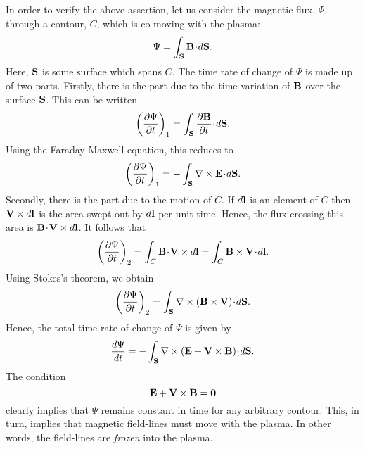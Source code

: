 In order to verify the above assertion, let us consider the
magnetic flux, ${\Psi}$, through a contour, $C$, which is co-moving
with the plasma:
\begin{equation}
{\Psi} = \int_{\bf S} {\bf B}\!\cdot\!d{\bf S}.
\end{equation}
Here, ${\bf S}$ is some surface which spans $C$. The time rate of
change of ${\Psi}$ is made up of two parts. Firstly, there
is the part due to the time variation of ${\bf B}$  over the
surface ${\bf S}$. This can be written
\begin{equation}
\left(\frac{\partial{ \Psi}}{\partial t}\right)_1 = 
\int_{\bf S} \frac{\partial{\bf B}}{\partial t}\!\cdot\!d{\bf S}.
\end{equation}
Using the Faraday-Maxwell equation, this reduces to
\begin{equation}
\left(\frac{\partial{ \Psi}}{\partial t}\right)_1 = -
\int_{\bf S} \nabla \times{\bf E} \!\cdot\!d{\bf S}.
\end{equation}
Secondly, there is the part due to the motion of $C$. If $d{\bf l}$
is an element of $C$ then ${\bf V}\times d{\bf l}$ is the area swept out
by $d{\bf l}$ per unit time. Hence, the flux crossing this area is
${\bf B} \!\cdot\!{\bf V}\times d{\bf l}$.
It follows that 
\begin{equation}
\left(\frac{\partial{ \Psi}}{\partial t}\right)_2 = \int_C {\bf B} \!\cdot\!{\bf V}\times d{\bf l} = \int_C {\bf B}\times{\bf V} \!\cdot\!d{\bf l}.
\end{equation}
Using Stokes's theorem, we obtain
\begin{equation}
\left(\frac{\partial{ \Psi}}{\partial t}\right)_2= \int_{\bf S} \nabla\times
({\bf B}\times
{\bf V})\!\cdot\!d{\bf S}.
\end{equation}
Hence, the total time rate of change of ${\Psi}$ is given by
\begin{equation}
\frac{d{\Psi}}{dt} = - \int_{\bf S}\nabla\times\left({\bf E} + {\bf V}\times
{\bf B}\right)\!\cdot\!d{\bf S}.
\end{equation} The condition 
\begin{equation}
{\bf E} + {\bf V}\times{\bf B} ={\bf 0}
\end{equation}
clearly implies that ${\Psi}$ remains constant in time
for any arbitrary contour.
This, in turn, implies that magnetic field-lines must move with the
plasma. In other words, the field-lines are {\em frozen}\/ into the plasma. 

